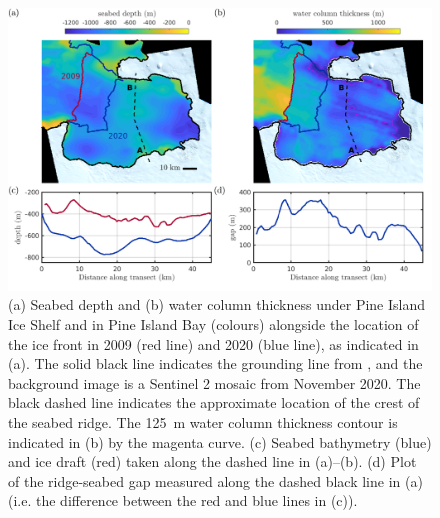 \documentclass[draft]{agujournal2019}
\begin{document}
\begin{figure}
    \centering
    \includegraphics[width = \textwidth]{../make_figures/plots/figure1_withColumnThickness.pdf}
    \caption{(a) Seabed depth and (b) water column thickness under Pine Island Ice Shelf and in Pine Island Bay (colours) alongside the location of the ice front in 2009 (red line) and 2020 (blue line), as indicated in (a). The solid black line indicates the grounding line from , and the background image is a Sentinel 2 mosaic from November 2020. The black dashed line indicates the approximate location of the crest of the seabed ridge. The 125~m  water column thickness contour is indicated in (b) by the magenta curve.  (c) Seabed bathymetry (blue) and ice draft (red) taken along the dashed line in (a)--(b). (d) Plot of the ridge-seabed gap measured along the dashed black line in (a) (i.e. the difference between the red and blue lines in (c)). }
    \label{fig:figure1}
\end{figure}
\end{document}
